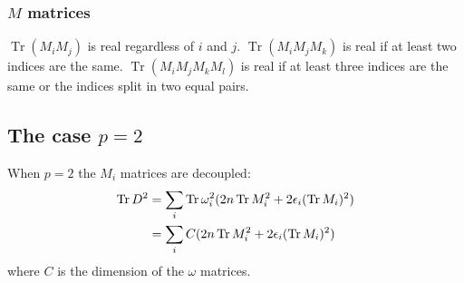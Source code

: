 \documentclass[12pt,a4paper]{article}
\DeclareMathOperator{\Tr}{Tr}
\begin{document}
\subsubsection{$M$ matrices}\label{sec:mat}
$\Tr (M_i M_j)$ is real regardless of $i$ and $j$. \newline
$\Tr(M_i M_j M_k)$ is real if at least two indices are the same. \newline
$\Tr(M_i M_j M_k M_l)$ is real if at least three indices are the same or the indices split in two equal pairs. 
\subsection{The case $p=2$}
When $p = 2$ the $M_i$ matrices are decoupled:
\begin{align}
\Tr D^2 &= \sum_i \Tr \omega_i^2 (2 n \Tr M_i^2 + 2 \epsilon_i (\Tr M_i)^2) \notag \\
&= \sum_i C (2 n \Tr M_i^2 + 2 \epsilon_i (\Tr M_i)^2)
\end{align} 
where $C$ is the dimension of the $\omega$ matrices.
\end{document}
